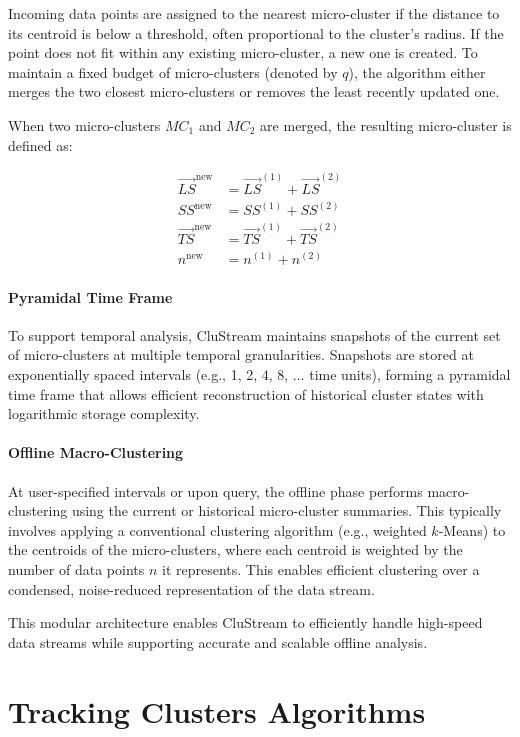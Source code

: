 Incoming data points are assigned to the nearest micro-cluster if the distance
to its centroid is below a threshold, often proportional to the cluster's
radius. If the point does not fit within any existing micro-cluster, a new one
is created. To maintain a fixed budget of micro-clusters (denoted by $q$), the
algorithm either merges the two closest micro-clusters or removes the least
recently updated one.

When two micro-clusters $MC_1$ and $MC_2$ are merged, the resulting
micro-cluster is defined as:

\begin{align}
    \vec{LS}^{\text{new}} & = \vec{LS}^{(1)} + \vec{LS}^{(2)} \\
    SS^{\text{new}}       & = SS^{(1)} + SS^{(2)}             \\
    \vec{TS}^{\text{new}} & = \vec{TS}^{(1)} + \vec{TS}^{(2)} \\
    n^{\text{new}}        & = n^{(1)} + n^{(2)}
\end{align}

\paragraph{Pyramidal Time Frame} To support temporal analysis, CluStream maintains snapshots of the current set
of micro-clusters at multiple temporal granularities. Snapshots are stored at
exponentially spaced intervals (e.g., 1, 2, 4, 8, $\dots$ time units), forming
a pyramidal time frame that allows efficient reconstruction of historical
cluster states with logarithmic storage complexity.

\paragraph{Offline Macro-Clustering} At user-specified intervals or upon query, the offline phase performs
macro-clustering using the current or historical micro-cluster summaries. This
typically involves applying a conventional clustering algorithm (e.g., weighted
$k$-Means) to the centroids of the micro-clusters, where each centroid is
weighted by the number of data points $n$ it represents. This enables efficient
clustering over a condensed, noise-reduced representation of the data stream.

This modular architecture enables CluStream to efficiently handle high-speed
data streams while supporting accurate and scalable offline analysis.

\section{Tracking Clusters Algorithms}\label{sec:tracking_clusters_algorithms}

